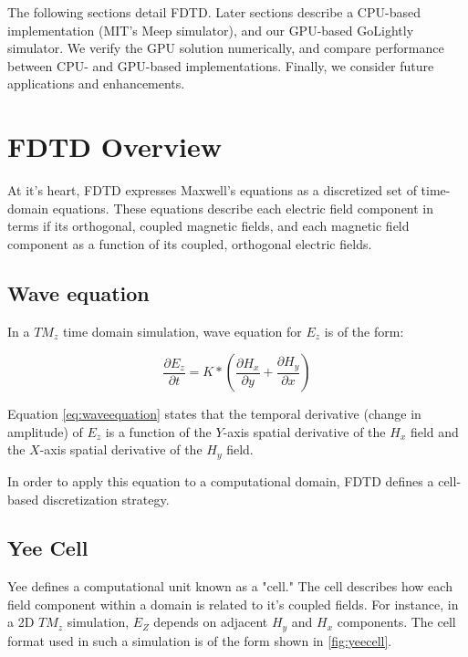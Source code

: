 The following sections detail FDTD. Later sections describe a CPU-based implementation (MIT's  Meep simulator), and our GPU-based GoLightly simulator. We verify the GPU solution numerically, and compare performance between CPU- and GPU-based implementations. Finally, we consider future applications and enhancements. 


\section{FDTD Overview}

At it's heart, FDTD expresses Maxwell's equations as a discretized set of time-domain equations\cite{Yee}. These equations describe each electric field component in terms if its orthogonal, coupled magnetic fields, and each magnetic field component as a function of its coupled, orthogonal electric fields.


\subsection{Wave equation}

In a $TM_z$ time domain simulation, wave equation for  $ E_z $ is of the form:

\begin{equation} \label{eq:waveequation} 
\frac{\partial E_z}{\partial t} = K * (\frac{\partial H_x}{\partial y} + \frac{\partial H_y}{\partial x})
\end{equation}

Equation \ref{eq:waveequation} states that the temporal derivative (change in amplitude) of $E_z$ is a function of the $Y$-axis spatial derivative of the $H_x$ field and the $X$-axis spatial derivative of the $H_y$ field.


In order to apply this equation to a computational domain, FDTD defines a cell-based discretization strategy.

\subsection{Yee Cell}

Yee \cite{Yee} defines a computational unit known as a "cell." The cell describes how each field component within a domain is related to it's coupled fields. For instance, in a 2D $TM_z$ simulation, $E_Z$ depends on adjacent $H_y$ and $H_x$ components. The cell format used in such a simulation is of the form shown in \ref{fig:yeecell}.

